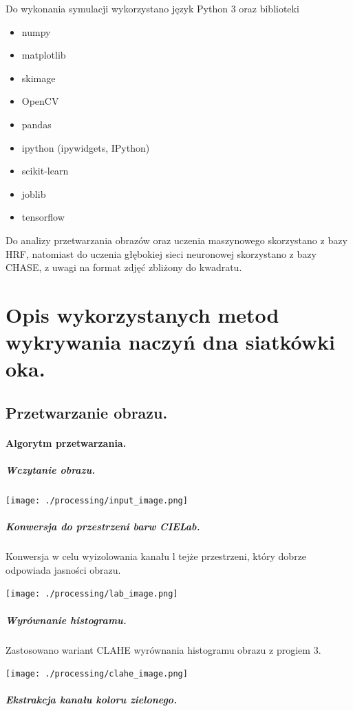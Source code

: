 \documentclass[a4paper, 11pt]{article}
\begin{document}
Do wykonania symulacji wykorzystano język Python 3 oraz biblioteki

\begin{itemize}
	\item numpy
	\item matplotlib
	\item skimage
	\item OpenCV
	\item pandas
	\item ipython (ipywidgets, IPython)
	\item scikit-learn
	\item joblib
	\item tensorflow
\end{itemize}


Do analizy przetwarzania obrazów oraz uczenia maszynowego skorzystano z bazy HRF, natomiast do uczenia głębokiej sieci neuronowej skorzystano z bazy CHASE, z uwagi na format zdjęć zbliżony do kwadratu.


\newpage

\section{Opis wykorzystanych metod wykrywania naczyń dna siatkówki oka.}
\subsection{Przetwarzanie obrazu.}
\paragraph{Algorytm przetwarzania.}
\subparagraph{Wczytanie obrazu.}
\begin{center}
	\texttt{[image: ./processing/input\_image.png]}
\end{center}

\subparagraph{Konwersja do przestrzeni barw CIELab.}


Konwersja w celu wyizolowania kanału l tejże przestrzeni, który dobrze odpowiada jasności obrazu.
\begin{center}
	\texttt{[image: ./processing/lab\_image.png]}
\end{center}

\newpage
\subparagraph{Wyrównanie histogramu.}


Zastosowano wariant CLAHE wyrównania histogramu obrazu z progiem 3.
\begin{center}
	\texttt{[image: ./processing/clahe\_image.png]}
\end{center}
\subparagraph{Ekstrakcja kanału koloru zielonego.}
\end{document}
